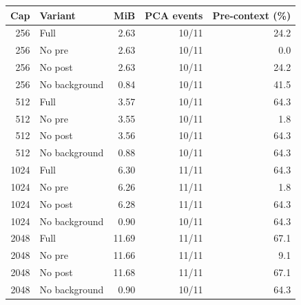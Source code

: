 \begin{tabular}{rlrrr}
\toprule
Cap & Variant & MiB & PCA events & Pre-context (\%) \\
\midrule
256 & Full & 2.63 & 10/11 & 24.2 \\
256 & No pre & 2.63 & 10/11 & 0.0 \\
256 & No post & 2.63 & 10/11 & 24.2 \\
256 & No background & 0.84 & 10/11 & 41.5 \\
512 & Full & 3.57 & 10/11 & 64.3 \\
512 & No pre & 3.55 & 10/11 & 1.8 \\
512 & No post & 3.56 & 10/11 & 64.3 \\
512 & No background & 0.88 & 10/11 & 64.3 \\
1024 & Full & 6.30 & 11/11 & 64.3 \\
1024 & No pre & 6.26 & 11/11 & 1.8 \\
1024 & No post & 6.28 & 11/11 & 64.3 \\
1024 & No background & 0.90 & 10/11 & 64.3 \\
2048 & Full & 11.69 & 11/11 & 67.1 \\
2048 & No pre & 11.66 & 11/11 & 9.1 \\
2048 & No post & 11.68 & 11/11 & 67.1 \\
2048 & No background & 0.90 & 10/11 & 64.3 \\
\bottomrule
\end{tabular}
